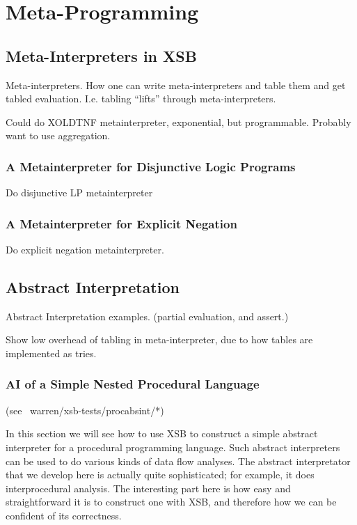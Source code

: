 \chapter{Meta-Programming}

\section{Meta-Interpreters in XSB}

Meta-interpreters. How one can write meta-interpreters and table them
and get tabled evaluation.  I.e. tabling ``lifts'' through
meta-interpreters.

Could do XOLDTNF metainterpreter, exponential, but programmable.
Probably want to use aggregation.

\subsection{A Metainterpreter for Disjunctive Logic Programs}
Do disjunctive LP metainterpreter

\subsection{A Metainterpreter for Explicit Negation}
Do explicit negation metainterpreter.

\section{Abstract Interpretation}

Abstract Interpretation examples.
        (partial evaluation, and assert.)

Show low overhead of tabling in meta-interpreter, due to how tables
are implemented as tries.

\subsection{AI of a Simple Nested Procedural Language}

(see ~warren/xsb-tests/procabsint/*)

In this section we will see how to use XSB to construct a simple
abstract interpreter for a procedural programming language.  Such
abstract interpreters can be used to do various kinds of data flow
analyses.  The abstract interpretator that we develop here is actually
quite sophisticated; for example, it does interprocedural analysis.
The interesting part here is how easy and straightforward it is to
construct one with XSB, and therefore how we can be confident of its
correctness.

